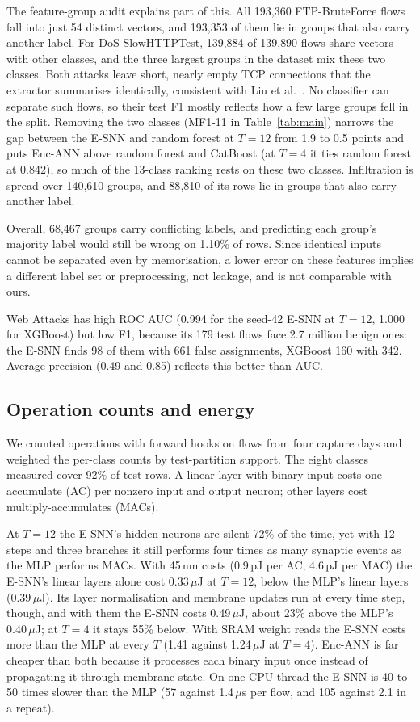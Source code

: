 \documentclass[conference]{IEEEtran}
\begin{document}
The feature-group audit explains part of this. All 193{,}360 FTP-BruteForce flows fall into just 54 distinct vectors, and 193{,}353 of them lie in groups that also carry another label. For DoS-SlowHTTPTest, 139{,}884 of 139{,}890 flows share vectors with other classes, and the three largest groups in the dataset mix these two classes. Both attacks leave short, nearly empty TCP connections that the extractor summarises identically, consistent with Liu et al.~\cite{liu2022}. No classifier can separate such flows, so their test F1 mostly reflects how a few large groups fell in the split. Removing the two classes (MF1-11 in Table~\ref{tab:main}) narrows the gap between the E-SNN and random forest at $T = 12$ from 1.9 to 0.5 points and puts Enc-ANN above random forest and CatBoost (at $T = 4$ it ties random forest at 0.842), so much of the 13-class ranking rests on these two classes. Infiltration is spread over 140{,}610 groups, and 88{,}810 of its rows lie in groups that also carry another label.

Overall, 68{,}467 groups carry conflicting labels, and predicting each group's majority label would still be wrong on 1.10\% of rows. Since identical inputs cannot be separated even by memorisation, a lower error on these features implies a different label set or preprocessing, not leakage, and is not comparable with ours.

Web Attacks has high ROC AUC (0.994 for the seed-42 E-SNN at $T = 12$, 1.000 for XGBoost) but low F1, because its 179 test flows face 2.7 million benign ones: the E-SNN finds 98 of them with 661 false assignments, XGBoost 160 with 342. Average precision (0.49 and 0.85) reflects this better than AUC.

\subsection{Operation counts and energy}

We counted operations with forward hooks on flows from four capture days and weighted the per-class counts by test-partition support. The eight classes measured cover 92\% of test rows. A linear layer with binary input costs one accumulate (AC) per nonzero input and output neuron; other layers cost multiply-accumulates (MACs).


At $T = 12$ the E-SNN's hidden neurons are silent 72\% of the time, yet with 12 steps and three branches it still performs four times as many synaptic events as the MLP performs MACs. With 45\,nm costs (0.9\,pJ per AC, 4.6\,pJ per MAC) the E-SNN's linear layers alone cost 0.33\,$\mu$J at $T = 12$, below the MLP's linear layers (0.39\,$\mu$J). Its layer normalisation and membrane updates run at every time step, though, and with them the E-SNN costs 0.49\,$\mu$J, about 23\% above the MLP's 0.40\,$\mu$J; at $T = 4$ it stays 55\% below. With SRAM weight reads the E-SNN costs more than the MLP at every $T$ (1.41 against 1.24\,$\mu$J at $T = 4$). Enc-ANN is far cheaper than both because it processes each binary input once instead of propagating it through membrane state. On one CPU thread the E-SNN is 40 to 50 times slower than the MLP (57 against 1.4\,$\mu$s per flow, and 105 against 2.1 in a repeat).
\end{document}
